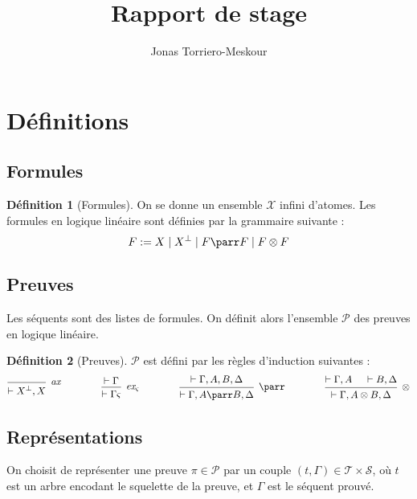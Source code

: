 \documentclass[11pt,a4paper]{article}
\title{Rapport de stage}
\author{Jonas Torriero-Meskour}
\theoremstyle{plain}
\theoremstyle{definition}
\newtheorem{definition}{Définition}
\theoremstyle{remark}
\newcommand*{\orth}{^\perp}
\newcommand*{\tensor}{\otimes}
\newcommand*{\hypv}[1]{\hypo{\vdash #1}}
\newcommand*{\axv}[1]{\infer{0}[\ensuremath{\mathit{ax}}]{\vdash #1}}
\newcommand*{\tensorv}[1]{\infer{2}[\ensuremath{\tensor}]{\vdash #1}}
\newcommand*{\parrv}[1]{\infer{1}[\ensuremath{\parr}]{\vdash #1}}
\newcommand*{\permv}[2]{\infer{1}[\ensuremath{\textit{ex}_{#1}}]{\vdash #2}}
\newcommand*{\permapp}[2]{#2 #1}
\newcommand*{\someperm}{\varsigma}
\newcommand*{\someproof}{\pi}
\newcommand*{\sequent}{\Gamma}
\newcommand*{\proofs}{\ensuremath{\mathcal{P}}}
\newcommand*{\sequents}{\ensuremath{\mathcal{S}}}
\newcommand*{\trees}{\ensuremath{\mathcal{T}}}
\newcommand*{\representationslarge}{\ensuremath{\trees \times \sequents}}
\begin{document}
\maketitle

\section{Définitions}

\subsection{Formules}
\begin{definition}[Formules]
On se donne un ensemble $\mathcal{X}$ infini d'atomes. Les formules en logique linéaire sont définies par la grammaire suivante :
\begin{equation*}
F := X \mid X\orth \mid F \parr F \mid F \tensor F
\end{equation*}
\end{definition}

\subsection{Preuves}
Les séquents sont des listes de formules. On définit alors l'ensemble \proofs{} des preuves en logique linéaire.
\begin{definition}[Preuves]
\proofs{} est défini par les règles d'induction suivantes :
\begin{equation*}
\begin{prooftree}
  \axv{X\orth, X}
\end{prooftree}
\qquad\qquad
\begin{prooftree}
  \hypv{\Gamma}
  \permv{\someperm}{\permapp{\someperm}{\Gamma}}
\end{prooftree}
\qquad\qquad
\begin{prooftree}
  \hypv{\Gamma, A, B, \Delta}
  \parrv{\Gamma, A \parr B, \Delta}
\end{prooftree}
\qquad\qquad
\begin{prooftree}
  \hypv{\Gamma, A}
  \hypv{B, \Delta}
  \tensorv{\Gamma, A \tensor B, \Delta}
\end{prooftree}
\end{equation*}
\end{definition}

\subsection{Représentations}
On choisit de représenter une preuve $\someproof \in \mathcal{P}$ par un couple $(t, \sequent) \in \representationslarge$, où $t$ est un arbre encodant le squelette de la preuve, et $\sequent$ est le séquent prouvé.
\end{document}
